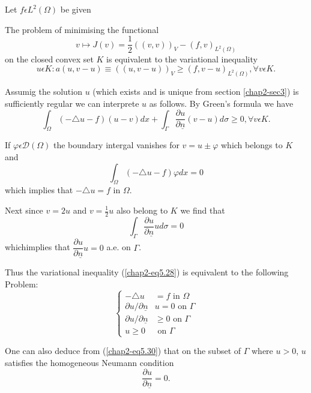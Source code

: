 Let $f \epsilon L^{2} (\Omega)$ be given

The problem of minimising the functional
\begin{equation*}
v \mapsto J(v) = \frac{1}{2} ((v, v))_{V} - (f, v)_{L^{2} (\Omega)}\tag{5.27}\label{chap2-eq5.27}
\end{equation*}
on the closed convex set $K$ is equivalent to the variational inequality
\begin{equation*}
u \epsilon K : a(u, v-u) \equiv ((u, v-u))_{V} \geq (f, v-u)_{L^{2} (\Omega)}, \forall v \epsilon K.\tag{5.28}\label{chap2-eq5.28}
\end{equation*}

Assumig the solution $u$ (which exists and is unique from section \ref{chap2-sec3}) is sufficiently regular we can interprete $u$ as follows. By Green's formula we have
\begin{equation*}
\int_{\Omega} (-\triangle u - f)(u - v) dx + \int_{\Gamma} \frac{\partial u}{\partial \underline{n}} (v-u) d\sigma \geq 0, \forall v \epsilon K.\tag{5.29}\label{chap2-eq5.29}
\end{equation*}

If $\varphi \epsilon \mathscr{D} (\Omega)$ the boundary intergal vanishes for $v = u \pm \varphi$ which belongs to $K$ and 
$$
\int_{\Omega} (-\triangle u - f)\varphi dx = 0
$$
which implies that $-\triangle u = f$ in $\Omega$.

Next since $v = 2u$ and $v = \frac{1}{2}u$ also belong to $K$ we find that
$$
\int_{\Gamma} \dfrac{\partial u}{\partial \underline{n}} u d\sigma = 0
$$
which\pageoriginale implies that $\dfrac{\partial u}{\partial \underline{n}} u = 0$ a.e. on $\Gamma$.

Thus the variational inequality (\ref{chap2-eq5.28}) is equivalent to the following Problem:
\begin{equation*}
\begin{cases}
-\triangle u & = f \text{ in } \Omega\\
\partial u / \partial \underline{n} & u  = 0 \text{ on } \Gamma\\
\partial u / \partial \underline{n} & \geq 0 \text{ on } \Gamma\\
u \geq 0 & \text{ on } \Gamma\tag{5.30}\label{chap2-eq5.30}
\end{cases}
\end{equation*}

One can also deduce from (\ref{chap2-eq5.30}) that on the subset of $\Gamma$ where $u > 0$, $u$ satisfies the homogeneous Neumann condition
$$
\dfrac{\partial u}{\partial \underline{n}} = 0.
$$

